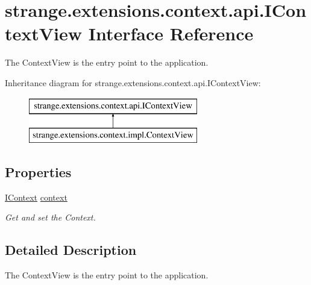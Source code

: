 \hypertarget{interfacestrange_1_1extensions_1_1context_1_1api_1_1_i_context_view}{\section{strange.\-extensions.\-context.\-api.\-I\-Context\-View Interface Reference}
\label{interfacestrange_1_1extensions_1_1context_1_1api_1_1_i_context_view}
}


The Context\-View is the entry point to the application.  


Inheritance diagram for strange.\-extensions.\-context.\-api.\-I\-Context\-View\-:\begin{figure}[H]
\begin{center}
\leavevmode
\includegraphics[height=2.000000cm]{interfacestrange_1_1extensions_1_1context_1_1api_1_1_i_context_view}
\end{center}
\end{figure}
\subsection*{Properties}
\begin{DoxyCompactItemize}
\item 
\hypertarget{interfacestrange_1_1extensions_1_1context_1_1api_1_1_i_context_view_a9b4c1082416793d613439d6934958cce}{\hyperlink{interfacestrange_1_1extensions_1_1context_1_1api_1_1_i_context}{I\-Context} \hyperlink{interfacestrange_1_1extensions_1_1context_1_1api_1_1_i_context_view_a9b4c1082416793d613439d6934958cce}{context}}\label{interfacestrange_1_1extensions_1_1context_1_1api_1_1_i_context_view_a9b4c1082416793d613439d6934958cce}

\begin{DoxyCompactList}\small\item\em Get and set the Context. \end{DoxyCompactList}\end{DoxyCompactItemize}


\subsection{Detailed Description}
The Context\-View is the entry point to the application. 

